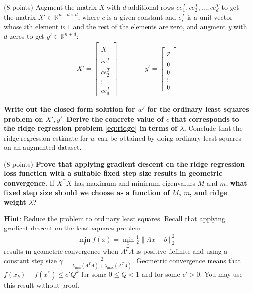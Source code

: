 \begin{Parts}


\Part (8 points) Augment the matrix $X$ with $d$ additional rows $ce_1^T,ce_2^T,\dots, ce_d^T$ to get the matrix $X' \in \mathbb{R}^{n+d \times d}$, where $c$ is a given constant and $e_i^T$ is a unit vector whose $i$th element is $1$ and the rest of the elements are zero, and augment $y$ with $d$ zeros to get $y' \in \mathbb{R}^{n+d}$:
\begin{align*}
X' = \begin{bmatrix}
 \\
X \\
 \\
c e_1^T\\
c e_2^T\\
\vdots\\
c e_d^T
\end{bmatrix} \qquad \qquad
y' = \begin{bmatrix}
 \\
y \\
 \\
0 \\
0 \\
\vdots \\
0
\end{bmatrix}
\end{align*}

\textbf{Write out the closed form solution for $w'$ for the ordinary least squares problem on $X', y'$.} 
\textbf{Derive the concrete value of $c$ that corresponds to the ridge regression problem \eqref{eq:ridge} in terms of $\lambda$.} Conclude that the ridge regression estimate for $w$ can be obtained by doing ordinary least squares on an augmented dataset.




\ifexamnosol
\newpage
\fi
\Part (8 points)
\textbf{Prove that applying gradient descent on the ridge regression
  loss function with a suitable fixed step size results in geometric
  convergence.} If $X^\top X$ has maximum and minimum eigenvalues $M$
and $m$, {\bf what fixed step size should we choose as a function of
  $M$, $m$, and ridge weight $\lambda$?}

\textbf{Hint}: Reduce the problem to ordinary least squares. Recall that applying gradient descent on the least squares problem
\begin{align*}
\min_x f(x) = \min_x \frac{1}{2}\| Ax - b \|_2^2
\end{align*}
results in geometric convergence when $A^TA$ is positive definite and
using a constant step size $\gamma=\frac{2}{\lambda_{\min}(A^TA) +
  \lambda_{\max}(A^TA)}$. Geometric convergence means that $f(x_k) -
f(x^*) \leq c' Q^{k}$ for some $0 \leq Q < 1$ and for some $c' > 0$. You may
use this result without proof.



\end{Parts} 

